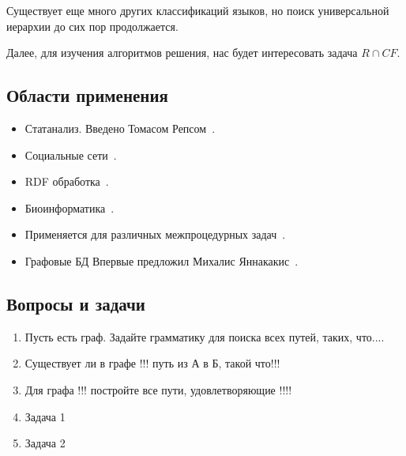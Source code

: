 Существует еще много других классификаций языков, но поиск универсальной иерархии до сих пор продолжается.

Далее, для изучения алгоритмов решения, нас будет интересовать задача $R \cap CF$.

\subsection{Области применения}
\begin{itemize}
	\item Статанализ. 
	Введено Томасом Репсом~\cite{Reps}.
	\item Социальные сети~\cite{Hellings2015PathRF}.
	\item RDF обработка~\cite{10.1007/978-3-319-46523-4_38}.
	\item Биоинформатика~\cite{cfpqBio}.
	\item Применяется для различных межпроцедурных задач~\cite{LabelFlowCFLReachability,specificationCFLReachability,Zheng}.
	\item Графовые БД
	Впервые предложил Михалис Яннакакис~\cite{Yannakakis}.
	
\end{itemize}

\subsection{Вопросы и задачи}
\begin{enumerate}
	\item Пусть есть граф. Задайте грамматику для поиска всех путей, таких, что....
	\item Существует ли в графе !!! путь из А в Б, такой что!!!
	\item Для графа !!! постройте все пути, удовлетворяющие !!!!
	
	\item Задача 1
	\item Задача 2
\end{enumerate}
